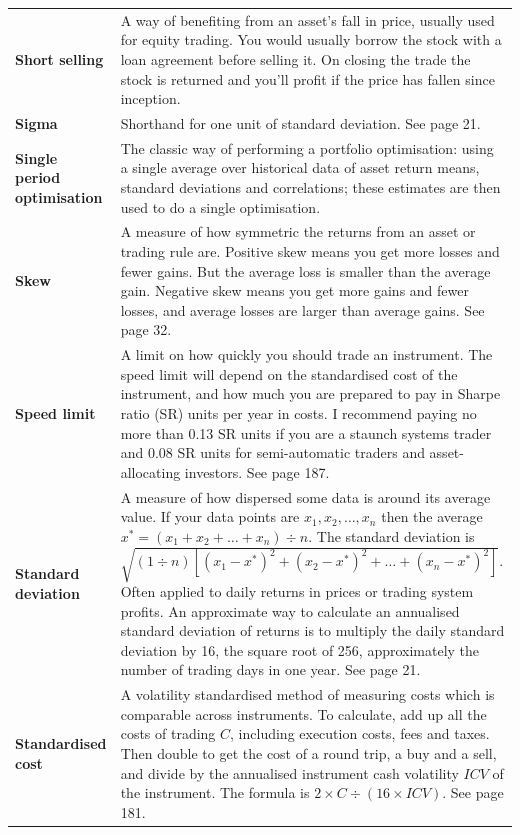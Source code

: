 {\begin{longtable}{@{}>{\raggedright\arraybackslash\bfseries} p{}>{\raggedright\arraybackslash} p{}@{}}
Short selling & A way of benefiting from an asset’s fall in price, usually used for equity trading. You would usually borrow the stock with a loan agreement before selling it. On closing the trade the stock is returned and you’ll profit if the price has fallen since inception. \\[0.65em]
Sigma & Shorthand for one unit of standard deviation. See page 21. \\[0.65em]
Single period optimisation & The classic way of performing a portfolio optimisation: using a single average over historical data of asset return means, standard deviations and correlations; these estimates are then used to do a single optimisation. \\[0.65em]
Skew & A measure of how symmetric the returns from an asset or trading rule are. Positive skew means you get more losses and fewer gains. But the average loss is smaller than the average gain. Negative skew means you get more gains and fewer losses, and average losses are larger than average gains. See page 32. \\[0.65em]
Speed limit & A limit on how quickly you should trade an instrument. The speed limit will depend on the standardised cost of the instrument, and how much you are prepared to pay in Sharpe ratio (SR) units per year in costs. I recommend paying no more than 0.13 SR units if you are a staunch systems trader and 0.08 SR units for semi-automatic traders and asset-allocating investors. See page 187. \\[0.65em]
Standard deviation & A measure of how dispersed some data is around its average value. If your data points are \(x_1, x_2, \ldots, x_n\) then the average \(x^* = (x_1 + x_2 + \ldots + x_n) \div n\). The standard deviation is \(\sqrt{(1 \div n)[(x_1 - x^*)^2 + (x_2 - x^*)^2 + \ldots + (x_n - x^*)^2]}\). Often applied to daily returns in prices or trading system profits. An approximate way to calculate an annualised standard deviation of returns is to multiply the daily standard deviation by 16, the square root of 256, approximately the number of trading days in one year. See page 21. \\[0.65em]
Standardised cost & A volatility standardised method of measuring costs which is comparable across instruments. To calculate, add up all the costs of trading \(C\), including execution costs, fees and taxes. Then double to get the cost of a round trip, a buy and a sell, and divide by the annualised instrument cash volatility \(ICV\) of the instrument. The formula is \(2 \times C \div (16 \times ICV)\). See page 181. \\[0.65em]

\end{longtable}}
